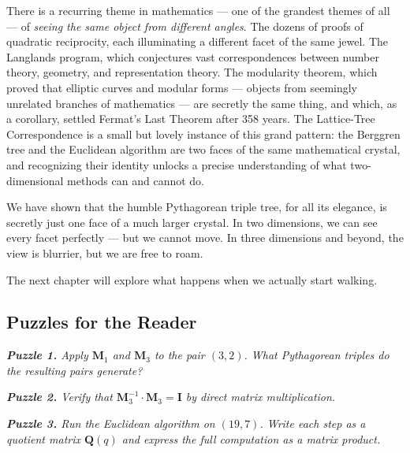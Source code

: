 \documentclass[11pt,openright,twoside]{book}
\renewenvironment{quotation}{%
  \par\vspace{8pt}%
  \begin{list}{}{%
    \setlength{\leftmargin}{2em}%
    \setlength{\rightmargin}{2em}%
  }\item[]\itshape\color{pullquote}%
}{%
  \end{list}%
  \par\vspace{8pt}%
}
\theoremstyle{definition}
\begin{document}
There is a recurring theme in mathematics --- one of the grandest themes of all --- of \textit{seeing the same object from different angles}. The dozens of proofs of quadratic reciprocity, each illuminating a different facet of the same jewel. The Langlands program, which conjectures vast correspondences between number theory, geometry, and representation theory. The modularity theorem, which proved that elliptic curves and modular forms --- objects from seemingly unrelated branches of mathematics --- are secretly the same thing, and which, as a corollary, settled Fermat's Last Theorem after 358 years. The Lattice-Tree Correspondence is a small but lovely instance of this grand pattern: the Berggren tree and the Euclidean algorithm are two faces of the same mathematical crystal, and recognizing their identity unlocks a precise understanding of what two-dimensional methods can and cannot do.

We have shown that the humble Pythagorean triple tree, for all its elegance, is secretly just one face of a much larger crystal. In two dimensions, we can see every facet perfectly --- but we cannot move. In three dimensions and beyond, the view is blurrier, but we are free to roam.

The next chapter will explore what happens when we actually start walking.


\bigskip


\subsection{Puzzles for the Reader}

\begin{quotation}
\noindent\itshape \textbf{Puzzle 1.} Apply $\mathbf{M}_1$ and $\mathbf{M}_3$ to the pair $(3, 2)$. What Pythagorean triples do the resulting pairs generate?
\end{quotation}

\begin{quotation}
\noindent\itshape \textbf{Puzzle 2.} Verify that $\mathbf{M}_3^{-1} \cdot \mathbf{M}_3 = \mathbf{I}$ by direct matrix multiplication.
\end{quotation}

\begin{quotation}
\noindent\itshape \textbf{Puzzle 3.} Run the Euclidean algorithm on $(19, 7)$. Write each step as a quotient matrix $\mathbf{Q}(q)$ and express the full computation as a matrix product.
\end{quotation}
\end{document}

